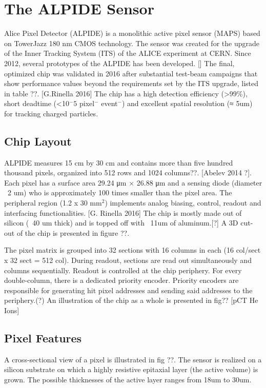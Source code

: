 \chapter{The ALPIDE Sensor}

Alice Pixel Detector (ALPIDE) is a monolithic active pixel sensor (MAPS) based on TowerJazz 180 nm CMOS technology.
The sensor was created for the upgrade of the Inner Tracking System (ITS) of the ALICE experiment at CERN.
Since 2012, several prototypes of the ALPIDE has been developed. []
The final, optimized chip was validated in 2016 after substantial test-beam campaigns that show performance values beyond the requirements set by the ITS upgrade, listed in table ??. [G.Rinella 2016]
The chip has a high detection efficiency (>99\%), short deadtime (<10$^-5$ pixel$^-$ event$^-$) and excellent spatial resolution (≈ 5um) for tracking charged particles.


\section{Chip Layout}
ALPIDE measures 15 cm by 30 cm and contains more than five hundred thousand pixels, organized into 512 rows and 1024 columns??. [Abelev 2014 ?].
Each pixel has a surface area 29.24 μm × 26.88 μm and a sensing diode (diameter ~2 um) who is approximately 100 times smaller than the pixel area.
The peripheral region (1.2 x 30 mm$^2$) implements analog biasing, control, readout and interfacing functionalities. [G. Rinella 2016]
The chip is mostly made out of silicon (~40 um thick) and is topped off with ~11um of aluminum.[?]
A 3D cut-out of the chip is presented in figure ??.

The pixel matrix is grouped into 32 sections with 16 columns in each (16 col/sect x 32 sect = 512 col).
During readout, sections are read out simultaneously and columns sequentially. Readout is controlled at the chip periphery.
For every double-column, there is a dedicated priority encoder.
Priority encoders are responsible for generating hit pixel addresses and sending said addresses to the periphery.(?)
An illustration of the chip as a whole is presented in fig?? [pCT He Ions]


\section{Pixel Features}
A cross-sectional view of a pixel is illustrated in fig ??.
The sensor is realized on a silicon substrate on which a highly resistive epitaxial layer (the active volume) is grown.
The possible thicknesses of the active layer ranges from 18um to 30um.

